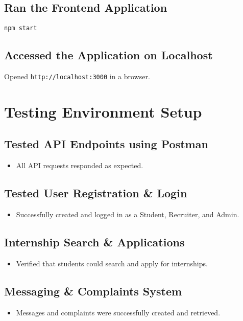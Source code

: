 \subsection{Ran the Frontend Application}
\begin{verbatim}
npm start
\end{verbatim}

\subsection*{Accessed the Application on Localhost}
Opened \texttt{http://localhost:3000} in a browser.

\section*{Testing Environment Setup}

\subsection{Tested API Endpoints using Postman}
\begin{itemize}
    \item All API requests responded as expected.
\end{itemize}

\subsection*{Tested User Registration \& Login}
\begin{itemize}
    \item Successfully created and logged in as a Student, Recruiter, and Admin.
\end{itemize}

\subsection{Internship Search \& Applications}
\begin{itemize}
    \item Verified that students could search and apply for internships.
\end{itemize}

\subsection{Messaging \& Complaints System}
\begin{itemize}
    \item Messages and complaints were successfully created and retrieved.
\end{itemize}

